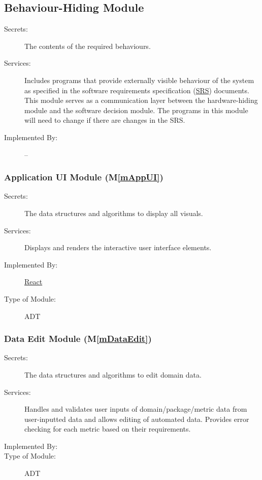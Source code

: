 \documentclass[12pt, titlepage]{article}
\newcommand{\mref}[1]{M\ref{#1}}
\begin{document}
\subsection{Behaviour-Hiding Module}

\begin{description}
\item[Secrets:]The contents of the required behaviours.
\item[Services:]Includes programs that provide externally visible behaviour of
  the system as specified in the software requirements specification (\href{https://github.com/thaafei/DomainX/blob/main/docs/SRS/SRS.pdf}{SRS})
  documents. This module serves as a communication layer between the
  hardware-hiding module and the software decision module. The programs in this
  module will need to change if there are changes in the SRS.
\item[Implemented By:] --
\end{description}


\subsubsection{ Application UI Module (\mref{mAppUI})}
\begin{description}
\item[Secrets:] The data structures and algorithms to display all visuals.
\item[Services:] Displays and renders the interactive user interface elements.
\item[Implemented By:] \href{https://react.dev/}{React}
\item[Type of Module:] ADT
\end{description}

\subsubsection{ Data Edit Module (\mref{mDataEdit})}
\begin{description}
\item[Secrets:] The data structures and algorithms to edit domain data.
\item[Services:]  Handles and validates user inputs of domain/package/metric data from user-inputted data and allows editing of automated data. Provides error checking for each metric based on their requirements.
\item[Implemented By:] \projname
\item[Type of Module:] ADT
\end{description}
\end{document}
